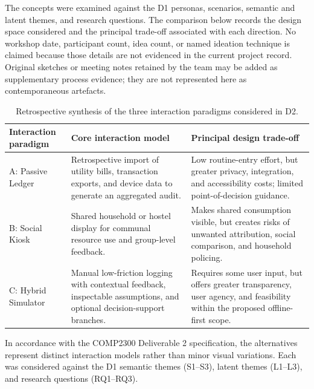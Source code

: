 \documentclass[12pt, a4paper]{article}
\begin{document}
The concepts were examined against the D1 personas, scenarios, semantic and latent themes, and research questions. The comparison below records the design space considered and the principal trade-off associated with each direction. No workshop date, participant count, idea count, or named ideation technique is claimed because those details are not evidenced in the current project record. Original sketches or meeting notes retained by the team may be added as supplementary process evidence; they are not represented here as contemporaneous artefacts.

\begin{table}[H]
\centering
\small
\renewcommand{\arraystretch}{1.3}
\begin{tabularx}{\textwidth}{@{}p{2.7cm} X X@{}}
\toprule
\textbf{Interaction paradigm} & \textbf{Core interaction model} & \textbf{Principal design trade-off} \\
\midrule
A: Passive Ledger & Retrospective import of utility bills, transaction exports, and device data to generate an aggregated audit. & Low routine-entry effort, but greater privacy, integration, and accessibility costs; limited point-of-decision guidance. \\
B: Social Kiosk & Shared household or hostel display for communal resource use and group-level feedback. & Makes shared consumption visible, but creates risks of unwanted attribution, social comparison, and household policing. \\
C: Hybrid Simulator & Manual low-friction logging with contextual feedback, inspectable assumptions, and optional decision-support branches. & Requires some user input, but offers greater transparency, user agency, and feasibility within the proposed offline-first scope. \\
\bottomrule
\end{tabularx}
\caption{Retrospective synthesis of the three interaction paradigms considered in D2.}
\label{tab:concept-paradigms}
\end{table}

In accordance with the COMP2300 Deliverable 2 specification, the alternatives represent distinct interaction models rather than minor visual variations. Each was considered against the D1 semantic themes (S1--S3), latent themes (L1--L3), and research questions (RQ1--RQ3).
\end{document}
